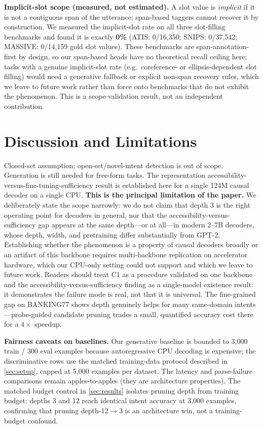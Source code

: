 \documentclass{article}
\begin{document}
\textbf{Implicit-slot scope (measured, not estimated).} A slot value is
\emph{implicit} if it is not a contiguous span of the utterance; span-based
taggers cannot recover it by construction. We measured the implicit-slot rate
on all three slot-filling benchmarks and found it is exactly \textbf{0\%}
(ATIS: 0/16{,}350; SNIPS: 0/37{,}542; MASSIVE: 0/14{,}159 gold slot values).
These benchmarks are span-annotation-first by design, so our span-based heads
have no theoretical recall ceiling here; tasks with a genuine implicit-slot
rate (e.g.\ coreference- or ellipsis-dependent slot filling) would need a
generative fallback or explicit non-span recovery rules, which we leave to
future work rather than force onto benchmarks that do not exhibit the
phenomenon. This is a scope-validation result, not an independent contribution.

\section{Discussion and Limitations}\label{sec:discussion}
Closed-set assumption; open-set/novel-intent detection is out of scope.
Generation is still needed for free-form tasks. The representation
accessibility-versus-fine-tuning-sufficiency result is established here for a
single 124M causal decoder on a single CPU. \textbf{This is the principal
limitation of the paper.} We deliberately state the scope narrowly: we do not
claim that depth 3 is the right operating point for decoders in general, nor
that the accessibility-versus-sufficiency gap appears at the same depth---or at
all---in modern 2--7B decoders, whose depth, width, and pretraining differ
substantially from GPT-2. Establishing whether the phenomenon is a property of
causal decoders broadly or an artifact of this backbone requires multi-backbone
replication on accelerator hardware, which our CPU-only setting could not
support and which we leave to future work. Readers should treat C1 as a
procedure validated on one backbone and the accessibility-versus-sufficiency
finding as a single-model existence result: it demonstrates the failure mode is
real, not that it is universal. The fine-grained gap on BANKING77 shows depth genuinely helps for
many same-domain intents---probe-guided candidate pruning trades a small,
quantified accuracy cost there for a $4\times$ speedup.

\textbf{Fairness caveats on baselines.} Our generative baseline is bounded to
3{,}000 train / 300 eval examples because autoregressive CPU decoding is
expensive; the discriminative rows use the matched training-data protocol
described in \cref{sec:setup}, capped at 5{,}000 examples per dataset. The
latency and parse-failure
comparisons remain apples-to-apples (they are architecture properties). The
matched budget control in \cref{sec:results} isolates pruning depth from training budget:
depths 3 and 12 reach identical intent accuracy at 3{,}000 examples,
confirming that pruning depth-12$\to$3 is an architecture win, not a
training-budget confound.
\end{document}
